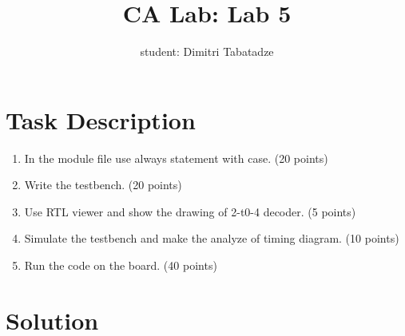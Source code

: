 \documentclass{article}
\title{CA Lab: Lab 5}
\author{student: Dimitri Tabatadze}
\begin{document}
    \maketitle

    \section*{Task Description} 
    
    \begin{enumerate}
        \item In the module file use always statement with case. (20 points)
        \item Write the testbench. (20 points)
        \item Use RTL viewer and show the drawing of 2-t0-4 decoder. (5 points)
        \item Simulate the testbench and make the analyze of timing diagram. (10 points)
        \item Run the code on the board. (40 points)
    \end{enumerate}

    \section*{Solution}
    
\end{document}
